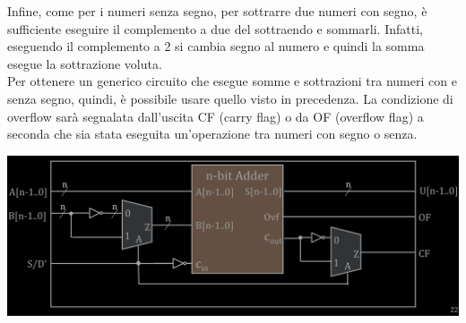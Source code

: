 \documentclass{article}
\begin{document}
Infine, come per i numeri senza segno, per sottrarre due numeri con segno, è sufficiente eseguire il complemento a due del sottraendo e sommarli. Infatti, eseguendo il complemento a 2 si cambia segno al numero e quindi la somma esegue la sottrazione voluta.\\
Per ottenere un generico circuito che esegue somme e sottrazioni tra numeri con e senza segno, quindi, è possibile usare quello visto in precedenza. La condizione di overflow sarà segnalata dall’uscita CF (carry flag) o da OF (overflow flag) a seconda che sia stata eseguita un’operazione tra numeri con segno o senza.
\begin{center}
    \includegraphics[scale=0.35]{n bit adder complemento.png}
\end{center}
\end{document}
